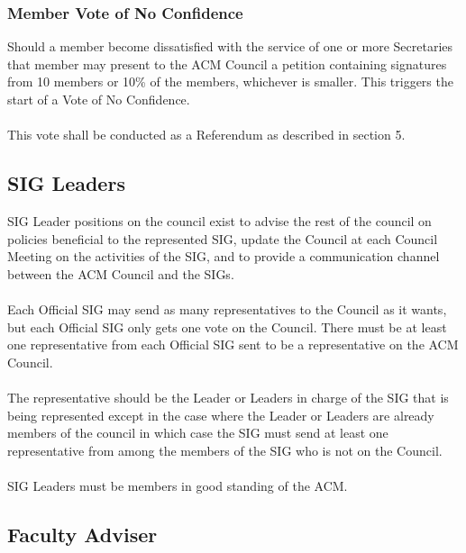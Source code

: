 \documentclass[12pt,titlepage]{article}
\begin{document}
\subsubsection{Member Vote of No Confidence}

Should a member become dissatisfied with the service of one or more Secretaries that member may present to the ACM Council a petition containing signatures from 10 members or 10\% of the members, whichever is smaller. This triggers the start of a Vote of No Confidence.\\
\\
This vote shall be conducted as a Referendum as described in section 5.

\subsection{SIG Leaders}

SIG Leader positions on the council exist to advise the rest of the council on policies beneficial to the represented SIG, update the Council at each Council Meeting on the activities of the SIG, and to provide a communication channel between the ACM Council and the SIGs.\\
\\
Each Official SIG may send as many representatives to the Council as it wants, but each Official SIG only gets one vote on the Council. There must be at least one representative from each Official SIG sent to be a representative on the ACM Council.\\
\\
The representative should be the Leader or Leaders in charge of the SIG that is being represented except in the case where the Leader or Leaders are already members of the council in which case the SIG must send at least one representative from among the members of the SIG who is not on the Council.\\
\\
SIG Leaders must be members in good standing of the ACM.

\subsection{Faculty Adviser}
\end{document}
